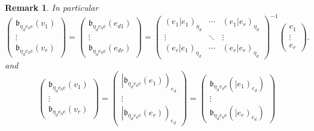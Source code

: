 \documentclass[aps,preprint]{revtex4}
\newtheorem{remark}[theorem]{Remark}
\begin{document}
\begin{remark}
In particular%
\begin{equation}
\left( 
\begin{array}{c}
\mathfrak{b}_{\eta _{d}e_{b}e}\left( \overset{}{v_{1}}\right) \\ 
\vdots \\ 
\mathfrak{b}_{\eta _{d}e_{b}e}\left( \overset{}{v_{r}}\right)%
\end{array}%
\right) =\left( 
\begin{array}{c}
\mathfrak{b}_{\eta _{d}e_{b}e}\left( \overset{}{e_{d1}}\right) \\ 
\vdots \\ 
\mathfrak{b}_{\eta _{d}e_{b}e}\left( \overset{}{e_{dr}}\right)%
\end{array}%
\right) =\left( 
\begin{array}{ccc}
\left( \left. e_{1}\right\vert e_{1}\right) _{\eta _{d}} & \cdots & \left(
\left. e_{1}\right\vert e_{r}\right) _{\eta _{d}} \\ 
\vdots & \ddots & \vdots \\ 
\left( \left. e_{r}\right\vert e_{1}\right) _{\eta _{d}} & \cdots & \left(
\left. e_{r}\right\vert e_{r}\right) _{\eta _{d}}%
\end{array}%
\right) ^{-1}\left( 
\begin{array}{c}
e_{1} \\ 
\vdots \\ 
e_{r}%
\end{array}%
\right) .
\end{equation}%
and 
\begin{equation}
\left( 
\begin{array}{c}
\mathfrak{b}_{\eta _{d}e_{b}e}\left( \overset{}{v_{1}}\right) \\ 
\vdots \\ 
\mathfrak{b}_{\eta _{d}e_{b}e}\left( \overset{}{v_{r}}\right)%
\end{array}%
\right) =\left( 
\begin{array}{c}
\left\vert \mathfrak{b}_{\eta _{d}e_{b}e}\left( e_{1}\right) \right) _{e_{d}}
\\ 
\vdots \\ 
\left\vert \mathfrak{b}_{\eta _{d}e_{b}e}\left( e_{r}\right) \right) _{e_{d}}%
\end{array}%
\right) =\left( 
\begin{array}{c}
\mathfrak{b}_{\eta _{d}e_{b}e}\left( \overset{}{\left\vert e_{1}\right)
_{e_{d}}}\right) \\ 
\vdots \\ 
\mathfrak{b}_{\eta _{d}e_{b}e}\left( \overset{}{\left\vert e_{r}\right)
_{e_{d}}}\right)%
\end{array}%
\right)
\end{equation}
\end{remark}
\end{document}
